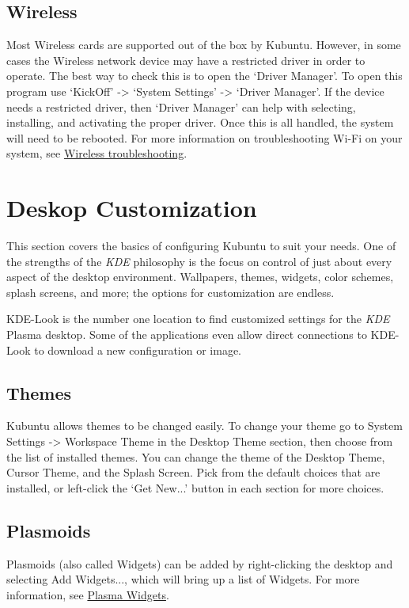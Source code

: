 \documentclass[letterpaper,10pt,english]{sphinxmanual}
\begin{document}
\subsection{Wireless}
\label{docs/basic:wireless}
Most Wireless cards are supported out of the box by Kubuntu. However, in some cases the Wireless network device may have a restricted driver in order to operate. The best way to check this is to open the `Driver Manager'. To open this program use `KickOff' -\textgreater{} `System Settings' -\textgreater{} `Driver Manager'. If the device needs a restricted driver, then `Driver Manager' can help with selecting, installing, and activating the proper driver. Once this is all handled, the system will need to be rebooted. For more information on troubleshooting Wi-Fi on your system, see \href{https://help.ubuntu.com/community/WifiDocs/WirelessTroubleShootingGuide}{Wireless troubleshooting}.


\section{Deskop Customization}
\label{docs/basic:deskop-customization}
This section covers the basics of configuring Kubuntu to suit your needs. One of the strengths of the \emph{KDE} philosophy is the focus on control of just about every aspect of the desktop environment. Wallpapers, themes, widgets, color schemes, splash screens, and more; the options for customization are endless.

KDE-Look is the number one location to find customized settings for the \emph{KDE} Plasma desktop. Some of the applications even allow direct connections to KDE-Look to download a new configuration or image.


\subsection{Themes}
\label{docs/basic:themes}
Kubuntu allows themes to be changed easily. To change your theme go to System Settings -\textgreater{} Workspace Theme in the Desktop Theme section, then choose from the list of installed themes. You can change the theme of the Desktop Theme, Cursor Theme, and the Splash Screen. Pick from the default choices that are installed, or left-click the `Get New...' button in each section for more choices.


\subsection{Plasmoids}
\label{docs/basic:plasmoids}
Plasmoids (also called Widgets) can be added by right-clicking the desktop and selecting Add Widgets..., which will bring up a list of Widgets. For more information, see \href{https://userbase.kde.org/Special:MyLanguage/Plasma\#Widgets}{Plasma Widgets}.
\end{document}
